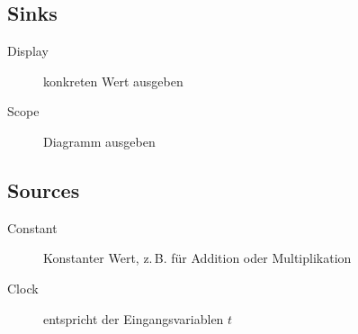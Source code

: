 \documentclass[%
	paper=a4,%
	pagesize=auto	%
	]{scrartcl}
\begin{document}
\subsection{Sinks}
	\begin{description}
	\item[Display]
		konkreten Wert ausgeben
	\item[Scope]
		Diagramm ausgeben
	\end{description}

\subsection{Sources}
	\begin{description}
	\item[Constant]
		Konstanter Wert, z.\,B. für Addition oder Multiplikation
	\item[Clock]
		entspricht der Eingangsvariablen \(t\)
	\end{description}
\end{document}
